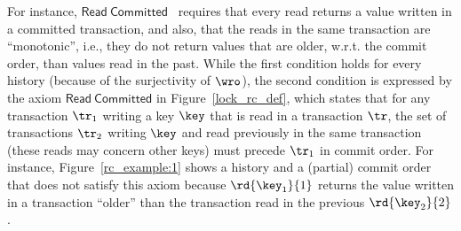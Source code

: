 For instance, $\mathsf{Read\ Committed}$~\cite{DBLP:conf/sigmod/BerensonBGMOO95} requires that every read returns a value written in a committed transaction, and also, that the reads in the same transaction are ``monotonic'', i.e., they do not return values that are older, w.r.t. the commit order, than values read in the past.
While the first condition holds for every history (because of the surjectivity of $\wro$), the second condition is expressed by the axiom $\mathsf{Read\ Committed}$ in Figure~\ref{lock_rc_def}, which states that for any transaction $\tr_1$ writing a key $\key$ that is read in a transaction $\tr$, the set of transactions $\tr_2$ writing $\key$ and read previously in the same transaction (these reads may concern other keys) must precede $\tr_1$ in commit order. 
For instance, Figure~\ref{rc_example:1} shows a history and a (partial) commit order that does not satisfy this axiom because $\rd{\key_1}{1}$ returns the value written in a transaction ``older'' than the transaction read in the previous $\rd{\key_2}{2}$. %

